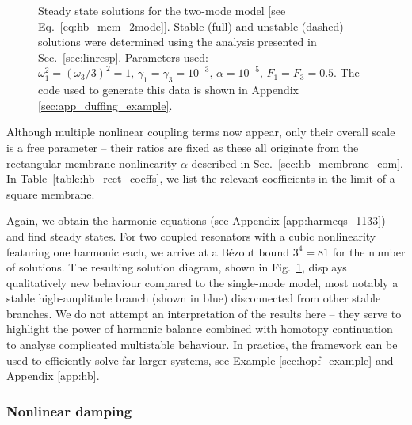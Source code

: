 %
\begin{figure}
	\centering
	
	\caption{Steady state solutions for the two-mode model [see Eq.~\eqref{eq:hb_mem_2mode}]. Stable (full) and unstable (dashed) solutions were determined using the analysis presented in Sec.~\ref{sec:linresp}. Parameters used: $\omega_1^2 = (\omega_3/3)^2 = 1, \, \gamma_1 = \gamma_3 = 10^{-3},\, \alpha = 10^{-5}, \, F_1 = F_3 = 0.5 $. The code used to generate this data is shown in Appendix \ref{sec:app_duffing_example}.}
	\label{fig:hb_rect_ss1}
\end{figure} 
Although multiple nonlinear coupling terms now appear, only their overall scale is a free parameter -- their ratios are fixed as these all originate from the rectangular membrane nonlinearity $\alpha$ described in Sec.~\ref{sec:hb_membrane_eom}. In Table~\ref{table:hb_rect_coeffs}, we list the relevant coefficients in the limit of a square membrane.

Again, we obtain the harmonic equations (see Appendix \ref{app:harmeqs_1133}) and find steady states. For two coupled resonators with a cubic nonlinearity featuring one harmonic each, we arrive at a B\'{e}zout bound $3^4 = 81$ for the number of solutions. The resulting solution diagram, shown in Fig.~\ref{fig:hb_rect_ss1}, displays qualitatively new behaviour compared to the single-mode model, most notably a stable high-amplitude branch (shown in blue) disconnected from other stable branches. We do not attempt an interpretation of the results here -- they serve to highlight the power of harmonic balance combined with homotopy continuation to analyse complicated multistable behaviour. In practice, the framework can be used to efficiently solve far larger systems, see Example \ref{sec:hopf_example} and Appendix \ref{app:hb}. 

\subsubsection{Nonlinear damping}

